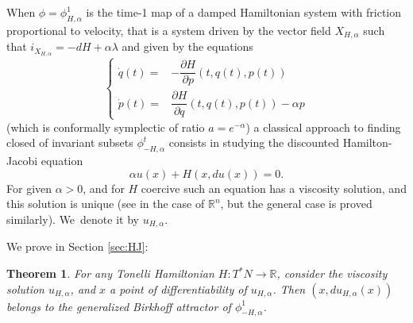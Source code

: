 \documentclass[JEP,XML,SOM,Unicode,NoFloatCountersInSection,published]{cedram}
\newtheorem{thm}{Theorem}[section]
\theoremstyle{definition}
\newcommand{\R}{\mathbb{R}}
\begin{document}
When $\phi=\phi_{H,\alpha}^1$ is the time-1 map of a damped Hamiltonian system with friction proportional to velocity, that is a system driven by the vector field $X_{H, \alpha}$ such that $i_{X_{H, \alpha}}=-dH+\alpha\lambda$ and given by the equations
\[
\begin{cases}
\dot q(t)=& -\dfrac{\partial H}{\partial p}(t,q(t),p(t))\\[8pt]
\dot p(t)=& \dfrac{\partial H}{\partial q}(t,q(t),p(t))-\alpha p
\end{cases}
\]
(which is conformally symplectic of ratio $a=e^{-\alpha}$) a classical approach to finding closed of invariant subsets $\phi_{-H,\alpha}^t$ consists in studying the discounted Hamilton-Jacobi equation
\begin{equation}
\label{eq:HJ-discounted}
\alpha u(x) + H(x,du(x))=0.
\end{equation}
For given $\alpha >0$, and for $H$ coercive such an equation has a viscosity solution, and this solution is unique (see \cite{Lions1982, Barles} in the case of ${\mathbb R}^n$, but the general case is proved similarly). We~denote it by $u_{H,\alpha}$.

We prove in Section \ref{sec:HJ}:

\begin{thm}\label{th:discounted}
For any Tonelli Hamiltonian $H:T^*N\to\R$, consider the viscosity solution $u_{H,\alpha}$, and $x$ a point of differentiability of $u_{H, \alpha}$. Then $(x,du_{H,\alpha}(x))$ belongs to the generalized Birkhoff attractor of $\phi_{-H,\alpha}^1$.
\end{thm}
\end{document}
